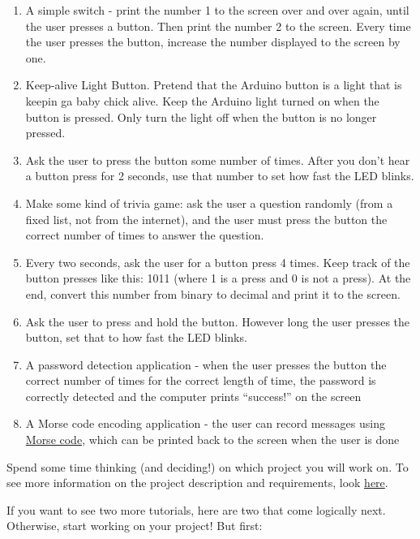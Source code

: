 \documentclass[letterpaper,10pt,english]{/usr/local/lib/python2.7/dist-packages/sphinx/texinputs/sphinxhowto}
\begin{document}
\begin{enumerate}[1.]
\item
  A simple switch - print the number 1 to the screen over and over
  again, until the user presses a button. Then print the number 2 to the
  screen. Every time the user presses the button, increase the number
  displayed to the screen by one.
\item
  Keep-alive Light Button. Pretend that the Arduino button is a light
  that is keepin ga baby chick alive. Keep the Arduino light turned on
  when the button is pressed. Only turn the light off when the button is
  no longer pressed.
\item
  Ask the user to press the button some number of times. After you don't
  hear a button press for 2 seconds, use that number to set how fast the
  LED blinks.
\item
  Make some kind of trivia game: ask the user a question randomly (from
  a fixed list, not from the internet), and the user must press the
  button the correct number of times to answer the question.
\item
  Every two seconds, ask the user for a button press 4 times. Keep track
  of the button presses like this: 1011 (where 1 is a press and 0 is not
  a press). At the end, convert this number from binary to decimal and
  print it to the screen.
\item
  Ask the user to press and hold the button. However long the user
  presses the button, set that to how fast the LED blinks.
\item
  A password detection application - when the user presses the button
  the correct number of times for the correct length of time, the
  password is correctly detected and the computer prints ``success!'' on
  the screen
\item
  A Morse code encoding application - the user can record messages using
  \href{http://en.wikipedia.org/wiki/Morse\_code}{Morse code}, which can
  be printed back to the screen when the user is done
\end{enumerate}Spend some time thinking (and deciding!) on which project you will work
on. To see more information on the project description and requirements,
look
\href{https://docs.google.com/a/meet.mit.edu/document/d/1HzMu8S\_8xAyPVDZaA\_JOZEW5XLl72B5BL6Jtiv3Hze0/edit\#heading=h.kpxwsy50i6vt}{here}.

If you want to see two more tutorials, here are two that come logically
next. Otherwise, start working on your project! But first:
\end{document}
